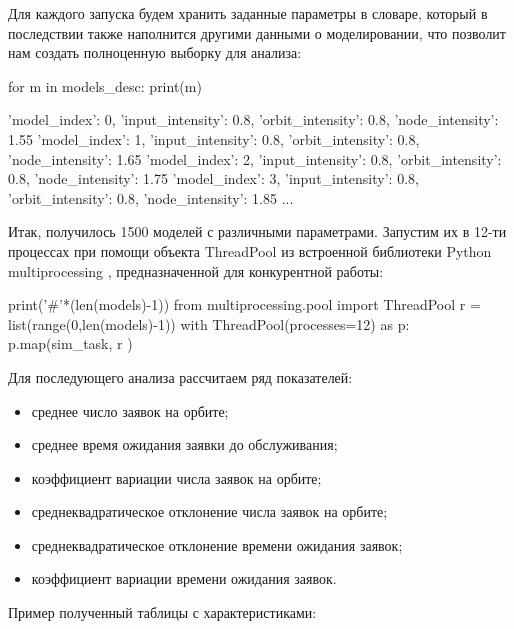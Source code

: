Для каждого запуска будем хранить заданные параметры в словаре, который в последствии также наполнится другими данными о моделировании, что позволит нам создать полноценную выборку для анализа:

\begin{pyin}
for m in models_desc:
   print(m)
\end{pyin}

\begin{pyprint}
{'model_index': 0, 'input_intensity': 0.8, 'orbit_intensity': 0.8, 'node_intensity': 1.55}
{'model_index': 1, 'input_intensity': 0.8, 'orbit_intensity': 0.8, 'node_intensity': 1.65}
{'model_index': 2, 'input_intensity': 0.8, 'orbit_intensity': 0.8, 'node_intensity': 1.75}
{'model_index': 3, 'input_intensity': 0.8, 'orbit_intensity': 0.8, 'node_intensity': 1.85}
...
\end{pyprint}

Итак, получилось 1500 моделей с различными параметрами. Запустим их в 12-ти процессах при помощи объекта ThreadPool из встроенной библиотеки Python multiprocessing \cite{multiproc}, предназначенной для конкурентной работы:
\begin{pyin}
print('#'*(len(models)-1))
from multiprocessing.pool import ThreadPool
r = list(range(0,len(models)-1))
with  ThreadPool(processes=12) as p:
   p.map(sim_task, r )
\end{pyin}

Для последующего анализа рассчитаем ряд показателей:
\begin{itemize}
	\item среднее число заявок на орбите;
	\item среднее время ожидания заявки до обслуживания;
	\item коэффициент вариации числа заявок на орбите;
	\item среднеквадратическое отклонение числа заявок на орбите;
	\item среднеквадратическое отклонение времени ожидания заявок;
	\item коэффициент вариации времени ожидания заявок.
\end{itemize}

Пример полученный таблицы с характеристиками:

